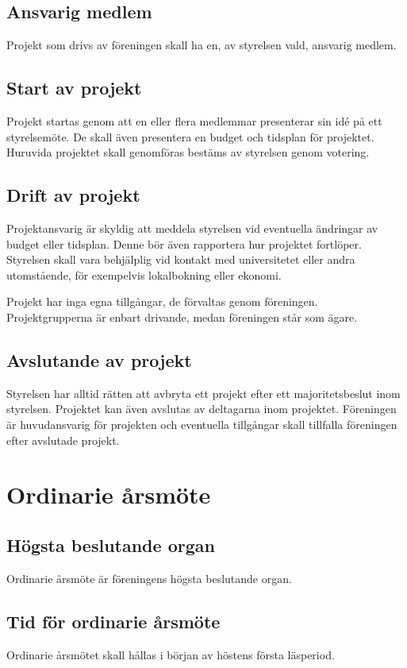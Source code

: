 \documentclass[11pt,a4paper]{article}
\begin{document}
\subsection{Ansvarig medlem}
Projekt som drivs av föreningen skall ha en, av styrelsen vald, ansvarig medlem.

\subsection{Start av projekt}
Projekt startas genom att en eller flera medlemmar presenterar sin idé på ett styrelsemöte. De skall även presentera en budget och tidsplan för projektet. Huruvida projektet skall genomföras bestäms av styrelsen genom votering.

\subsection{Drift av projekt}
Projektansvarig är skyldig att meddela styrelsen vid eventuella ändringar av budget eller tidsplan. Denne bör även rapportera hur projektet fortlöper. Styrelsen skall vara behjälplig vid kontakt med universitetet eller andra utomstående, för exempelvis lokalbokning eller ekonomi.

Projekt har inga egna tillgångar, de förvaltas genom föreningen. Projektgrupperna är enbart drivande, medan föreningen står som ägare. 

\subsection{Avslutande av projekt}
Styrelsen har alltid rätten att avbryta ett projekt efter ett majoritetsbeslut inom styrelsen. Projektet kan även avslutas av deltagarna inom projektet. 
Föreningen är huvudansvarig för projekten och eventuella tillgångar skall tillfalla föreningen efter avslutade projekt. 




\section{Ordinarie årsmöte}

\subsection{Högsta beslutande organ}
Ordinarie årsmöte är föreningens högsta beslutande organ.
\subsection{Tid för ordinarie årsmöte}
Ordinarie årsmötet skall hållas i början av höstens första läsperiod. 
\end{document}
